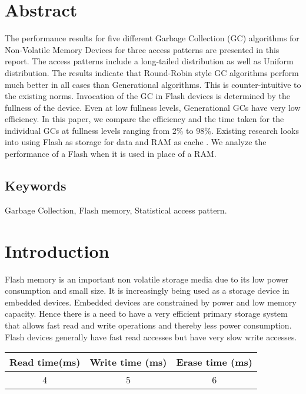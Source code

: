 \section{Abstract}
	The performance results for five different Garbage Collection (GC) algorithms for Non-Volatile Memory Devices for three access patterns are presented in this report. The access patterns include a long-tailed distribution as well as Uniform distribution. The results indicate that Round-Robin style GC algorithms perform much better in all cases than Generational algorithms. This is counter-intuitive to the existing norms. Invocation of the GC in Flash devices is determined by the fullness of the device. Even at low fullness levels, Generational GCs have very low efficiency. In this paper, we compare the efficiency and the time taken for the individual GCs at fullness levels ranging from 2\% to 98\%.  Existing research looks into using Flash as storage for data and RAM as cache \cite{Gupta09, Budilovsky11, Tjioe12}. We analyze the performance of a Flash when it is used in place of a RAM.

\subsection*{Keywords}
	Garbage Collection, Flash memory, Statistical access pattern.

\section{Introduction}
	Flash memory is an important non volatile storage media due to its low power consumption and small size. It is increasingly being used as a storage device in embedded devices. Embedded devices are constrained by power and low memory capacity. Hence there is a need to have a very efficient primary storage system that allows fast read and write operations and thereby less power consumption. Flash devices generally have fast read accesses but have very slow write accesses. \\

\begin{center}
   \begin{tabular} {|  c | c | c | }
       \hline
	Read time(ms) & Write time (ms) & Erase time (ms) \\ \hline
	4 & 5 & 6 \\ 
       \hline
   \end{tabular}
\end{center}

